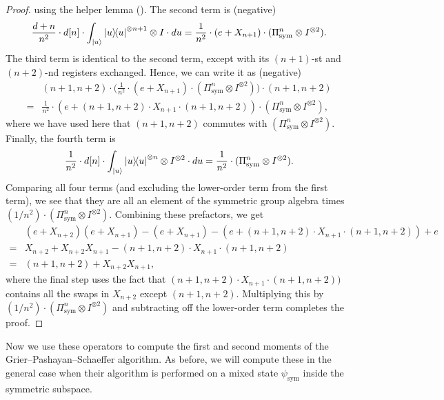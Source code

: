 \documentclass{article}
\begin{document}
\begin{proof}
    using the helper lemma (). The second term is (negative)
    \begin{align*}
        \frac{d+n}{n^2} \cdot d[n] \cdot \int_{\ket{u}}\ketbra{u}^{\otimes n+1} \otimes I \cdot du
        =\frac{1}{n^2} \cdot (e + X_{n+1}) \cdot (\Pi_{\mathrm{sym}}^{n} \otimes I^{\otimes 2}).
    \end{align*}
    The third term is identical to the second term, except with its $(n+1)$-st and $(n+2)$-nd registers exchanged. Hence, we can write it as (negative)
    \begin{align*}
        &(n+1, n+2) \cdot \Big(\frac{1}{n^2} \cdot (e + X_{n+1}) \cdot (\Pi_{\mathrm{sym}}^{n} \otimes I^{\otimes 2})\Big) \cdot (n+1, n+2)\\
        ={}&  \frac{1}{n^2} \cdot (e + (n+1, n+2)\cdot X_{n+1}\cdot(n+1, n+2)) \cdot (\Pi_{\mathrm{sym}}^{n} \otimes I^{\otimes 2}),
    \end{align*}
   where we have used here that $(n+1, n+2)$ commutes with $(\Pi_{\mathrm{sym}}^n \otimes I^{\otimes 2})$.
    Finally, the fourth term is
    \begin{equation*}
        \frac{1}{n^2} \cdot d[n] \cdot \int_{\ket{u}} \ketbra{u}^{\otimes n} \otimes I^{\otimes 2} \cdot du = \frac{1}{n^2} \cdot (\Pi_{\mathrm{sym}}^n \otimes I^{\otimes 2}).
    \end{equation*}
    Comparing all four terms (and excluding the lower-order term from the first term), we see that they are all an element of the symmetric group algebra times $(1/n^2) \cdot (\Pi_{\mathrm{sym}}^n \otimes I^{\otimes 2})$. 
    Combining these prefactors, we get
    \begin{align*}
        &(e+ X_{n+2})(e+X_{n+1}) - (e+X_{n+1}) - (e + (n+1, n+2) \cdot X_{n+1} \cdot (n+1, n+2)) + e\\
        ={}&X_{n+2} + X_{n+2}X_{n+1} - (n+1, n+2) \cdot X_{n+1} \cdot (n+1, n+2)\\
        ={}&(n+1, n+2) + X_{n+2}X_{n+1},
    \end{align*}
    where the final step uses the fact that $(n+1, n+2) \cdot X_{n+1} \cdot (n+1, n+2))$ contains all the swaps in $X_{n+2}$ except $(n+1, n+2)$.
    Multiplying this by $(1/n^2) \cdot (\Pi_{\mathrm{sym}}^n \otimes I^{\otimes 2})$ and subtracting off the lower-order term completes the proof.
\end{proof}

Now we use these operators to compute the first and second moments of the Grier--Pashayan--Schaeffer algorithm.
As before, we will compute these in the general case when their algorithm is performed on a mixed state $\psi_{\mathrm{sym}}$ inside the symmetric subspace.
\end{document}
